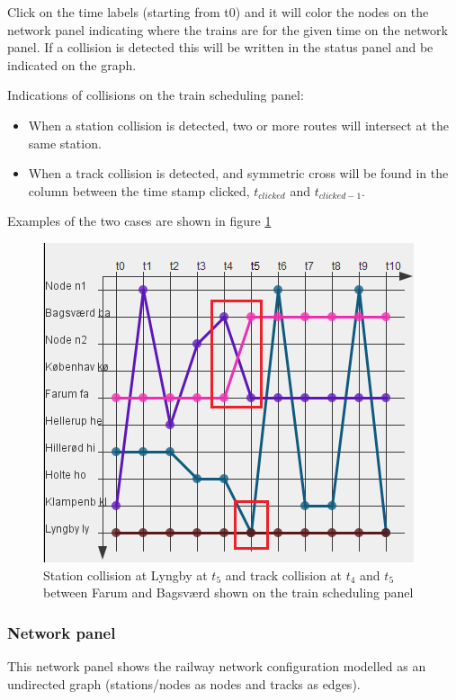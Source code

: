 \documentclass[10pt,a4paper]{article}
\begin{document}
Click on the time labels (starting from t0) and it will color the nodes on the network panel indicating where the trains are for the given time on the network panel.
If a collision is detected this will be written in the status panel and be indicated on the graph.
 
Indications of collisions on the train scheduling panel:
\begin{itemize}
  \item When a station collision is detected, two or more routes will intersect at the same station.
  \item When a track collision is detected, and symmetric cross will be found in the column between the time stamp clicked, $t_{clicked}$ and $t_{clicked - 1}$.
\end{itemize} 

Examples of the two cases are shown in figure \ref{fig:graphical_schedule}
\begin{figure}[h]
\centering
\includegraphics[scale=0.7]{fig/visual_graph.png}
 \caption{Station collision at Lyngby at $t_5$ and track collision at $t_4$ and $t_5$ between Farum and Bagsværd shown on the train scheduling panel}
 \label{fig:graphical_schedule}
\end{figure}

\subsubsection{Network panel}
 
This network panel shows the railway network configuration modelled as an undirected graph (stations/nodes as nodes and tracks as edges).
 
\end{document}
